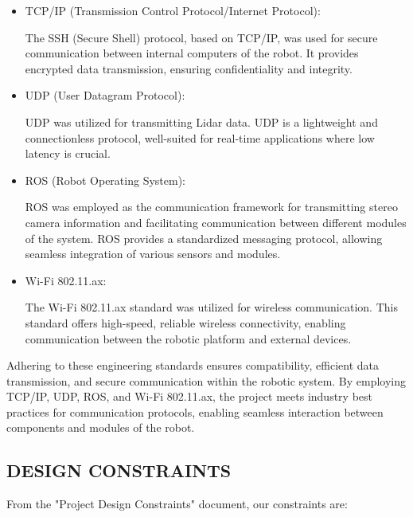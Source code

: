 \documentclass[12pt]{article}
\begin{document}
\begin{itemize}
    \item TCP/IP (Transmission Control Protocol/Internet Protocol):
          
          The SSH (Secure Shell) protocol, based on TCP/IP, was used for secure communication between internal computers of the robot. It provides encrypted data transmission, ensuring confidentiality and integrity. 
          
    \item UDP (User Datagram Protocol):
          
          UDP was utilized for transmitting Lidar data. UDP is a lightweight and connectionless protocol, well-suited for real-time applications where low latency is crucial. 
          
    \item ROS (Robot Operating System):
          
          ROS was employed as the communication framework for transmitting stereo camera information and facilitating communication between different modules of the system. ROS provides a standardized messaging protocol, allowing seamless integration of various sensors and modules. 
          
    \item Wi-Fi 802.11.ax:
          
          The Wi-Fi 802.11.ax standard was utilized for wireless communication. This standard offers high-speed, reliable wireless connectivity, enabling communication between the robotic platform and external devices. 
\end{itemize}

Adhering to these engineering standards ensures compatibility, efficient data transmission, and secure communication within the robotic system. By employing TCP/IP, UDP, ROS, and Wi-Fi 802.11.ax, the project meets industry best practices for communication protocols, enabling seamless interaction between components and modules of the robot. 


\subsection{DESIGN CONSTRAINTS}

From the "Project Design Constraints" document, our constraints are:
\end{document}
